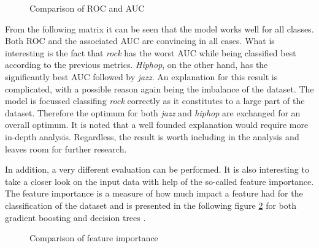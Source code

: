 
  \begin{figure}[H]
    \centering
    \qquad
    \caption{Comparison of ROC and AUC}%
    \label{fig:roc_and_auc_for_gb_and_dt}%
\end{figure}

From the following matrix it can be seen that the model works well for all classes. Both \ac{ROC} and the associated \ac{AUC} are convincing 
in all cases. What is interesting is the fact that \emph{rock} has the worst \ac{AUC} while being classified best according to the previous metrics.
\emph{Hiphop}, on the other hand, has the significantly best \ac{AUC} followed by \emph{jazz}. An explanation for this result is complicated, with a 
possible reason again being the imbalance of the dataset. The model is focussed classifing \emph{rock} correctly as it constitutes to a large part of the 
dataset. Therefore the optimum for both \emph{jazz} and \emph{hiphop} are exchanged for an overall optimum. It is noted that a well founded 
explanation would require more in-depth analysis. Regardless, the result is worth including in the analysis and leaves room for 
further research.   

In addition, a very different evaluation can be performed. It is also interesting to take a closer look on the input data with help of 
the so-called feature importance. The feature importance is a measure of how much impact a feature had for the classification of the 
dataset and is presented in the following figure \ref{fig:feature_inportance_for_gb_and_dt} for both gradient boosting and decision trees \cite{scikit-learn_feature_importance}. 

\begin{figure}[H]
  \centering
  \qquad
  \caption{Comparison of feature importance}%
  \label{fig:feature_inportance_for_gb_and_dt}%
\end{figure}

